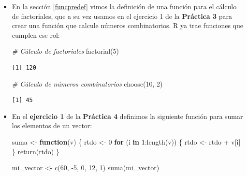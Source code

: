 \documentclass[
]{book}
\newenvironment{Shaded}{\begin{snugshade}}{\end{snugshade}}
\newcommand{\CommentTok}[1]{\textcolor[rgb]{0.56,0.35,0.01}{\textit{#1}}}
\newcommand{\ControlFlowTok}[1]{\textcolor[rgb]{0.13,0.29,0.53}{\textbf{#1}}}
\newcommand{\DecValTok}[1]{\textcolor[rgb]{0.00,0.00,0.81}{#1}}
\newcommand{\FunctionTok}[1]{\textcolor[rgb]{0.00,0.00,0.00}{#1}}
\newcommand{\NormalTok}[1]{#1}
\newcommand{\OtherTok}[1]{\textcolor[rgb]{0.56,0.35,0.01}{#1}}
\newcommand{\SpecialCharTok}[1]{\textcolor[rgb]{0.00,0.00,0.00}{#1}}
\begin{document}
\begin{itemize}
\item
  En la sección \ref{funcpredef} vimos la definición de una función para el cálculo de factoriales, que a su vez usamos en el ejercicio 1 de la \textbf{Práctica 3} para crear una función que calcule números combinatorios. R ya trae funciones que cumplen ese rol:

\begin{Shaded}
\begin{Highlighting}[]
\CommentTok{\# Cálculo de factoriales}
\FunctionTok{factorial}\NormalTok{(}\DecValTok{5}\NormalTok{)}
\end{Highlighting}
\end{Shaded}

\begin{verbatim}
[1] 120
\end{verbatim}

\begin{Shaded}
\begin{Highlighting}[]
\CommentTok{\# Cálculo de números combinatorios}
\FunctionTok{choose}\NormalTok{(}\DecValTok{10}\NormalTok{, }\DecValTok{2}\NormalTok{)}
\end{Highlighting}
\end{Shaded}

\begin{verbatim}
[1] 45
\end{verbatim}
\item
  En el \textbf{ejercicio 1} de la \textbf{Práctica 4} definimos la siguiente función para sumar los elementos de un vector:

\begin{Shaded}
\begin{Highlighting}[]
\NormalTok{suma }\OtherTok{\textless{}{-}} \ControlFlowTok{function}\NormalTok{(v) \{}
\NormalTok{    rtdo }\OtherTok{\textless{}{-}} \DecValTok{0}
    \ControlFlowTok{for}\NormalTok{ (i }\ControlFlowTok{in} \DecValTok{1}\SpecialCharTok{:}\FunctionTok{length}\NormalTok{(v)) \{}
\NormalTok{        rtdo }\OtherTok{\textless{}{-}}\NormalTok{ rtdo }\SpecialCharTok{+}\NormalTok{ v[i]}
\NormalTok{    \}}
    \FunctionTok{return}\NormalTok{(rtdo)}
\NormalTok{\}}

\NormalTok{mi\_vector }\OtherTok{\textless{}{-}} \FunctionTok{c}\NormalTok{(}\DecValTok{60}\NormalTok{, }\SpecialCharTok{{-}}\DecValTok{5}\NormalTok{, }\DecValTok{0}\NormalTok{, }\DecValTok{12}\NormalTok{, }\DecValTok{1}\NormalTok{)}
\FunctionTok{suma}\NormalTok{(mi\_vector)}
\end{Highlighting}
\end{Shaded}


\end{itemize}
\end{document}
